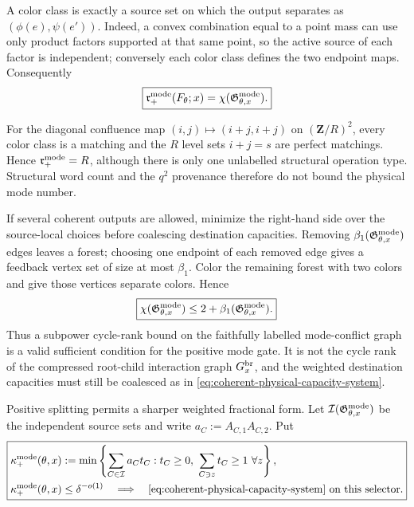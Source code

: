 \documentclass[11pt]{article}
\begin{document}
A color class is exactly a source set on which the output separates as
\((\phi(e),\psi(e'))\).  Indeed, a convex combination equal to a point mass
can use only product factors supported at that same point, so the active
source of each factor is independent; conversely each color class defines
the two endpoint maps.  Consequently
\begin{equation}\label{eq:deterministic-mode-conflict-rank}
 \boxed{
 \mathfrak r_{+}^{\rm mode}(F_\theta;x)
 =\chi(\mathfrak G_{\theta,x}^{\rm mode}).}
\end{equation}

For the diagonal confluence map
\((i,j)\mapsto(i+j,i+j)\) on \((\mathbf Z/R)^2\), every color class is a
matching and the \(R\) level sets \(i+j=s\) are perfect matchings.  Hence
\(\mathfrak r_{+}^{\rm mode}=R\), although there is only one unlabelled
structural operation type.  Structural word count and the \(q^2\) provenance
therefore do not bound the physical mode number.

If several coherent outputs are allowed, minimize the right-hand side over
the source-local choices before coalescing destination capacities.  Removing
\(\beta_1(\mathfrak G_{\theta,x}^{\rm mode})\) edges leaves a forest; choosing
one endpoint of each removed edge gives a feedback vertex set of size at most
\(\beta_1\).  Color the remaining forest with two colors and give those
vertices separate colors.  Hence
\begin{equation}\label{eq:mode-conflict-cycle-rank-bound}
 \boxed{
 \chi(\mathfrak G_{\theta,x}^{\rm mode})
 \le 2+\beta_1(\mathfrak G_{\theta,x}^{\rm mode}).}
\end{equation}
Thus a subpower cycle-rank bound on the faithfully labelled mode-conflict
graph is a valid sufficient condition for the positive mode gate.  It is
not the cycle rank of the compressed root-child interaction graph
\(G_x^{\rm br}\), and the weighted destination capacities must still be
coalesced as in \eqref{eq:coherent-physical-capacity-system}.

Positive splitting permits a sharper weighted fractional form.  Let
\(\mathcal I(\mathfrak G_{\theta,x}^{\rm mode})\) be the independent source
sets and write \(a_C:=A_{C,1}A_{C,2}\).  Put
\begin{equation}\label{eq:fractional-mode-capacity}
 \boxed{
 \begin{aligned}
 \kappa_{+}^{\rm mode}(\theta,x)
 &:=
 \min\left\{
  \sum_{C\in\mathcal I}a_Ct_C:
  t_C\ge0,\ \sum_{C\ni z}t_C\ge1\ \forall z
 \right\},\\
 \kappa_{+}^{\rm mode}(\theta,x)
 &\le\delta^{-o(1)}
 \quad\Longrightarrow\quad
 \text{\eqref{eq:coherent-physical-capacity-system} on this selector}.
 \end{aligned}}
\end{equation}
\end{document}
